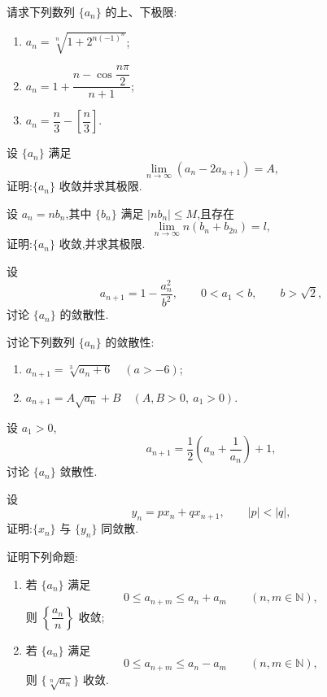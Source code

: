 \documentclass[../数学分析培优讲义.tex]{subfiles}
\begin{document}
\begin{example}
请求下列数列 $\{a_n\}$ 的上、下极限:
\begin{enumerate}[label=(\arabic*)]
  \item $\displaystyle a_n=\sqrt[n]{1+2^{n(-1)^n}}$;
  \item $\displaystyle a_n=1+\dfrac{n-\cos\dfrac{n\pi}{2}}{n+1}$;
  \item $\displaystyle a_n=\dfrac{n}{3}-\left[\dfrac{n}{3}\right]$.
\end{enumerate}
\end{example}
\exampleblank

\begin{example}
设 $\{a_n\}$ 满足
\[
\lim\limits_{n\to\infty}(a_n-2a_{n+1})=A,
\]
证明:$\{a_n\}$ 收敛并求其极限.
\end{example}
\exampleblank

\begin{example}
设 $a_n=nb_n$,其中 $\{b_n\}$ 满足 $|nb_n|\leq M$,且存在
\[
\lim\limits_{n\to\infty}n(b_n+b_{2n})=l,
\]
证明:$\{a_n\}$ 收敛,并求其极限.
\end{example}
\exampleblank

\begin{example}
设
\[
a_{n+1}=1-\dfrac{a_n^2}{b^2},
\qquad 0<a_1<b,
\qquad b>\sqrt2,
\]
讨论 $\{a_n\}$ 的敛散性.
\end{example}
\exampleblank

\begin{example}
讨论下列数列 $\{a_n\}$ 的敛散性:
\begin{enumerate}[label=(\arabic*)]
  \item $\displaystyle a_{n+1}=\sqrt[3]{a_n+6}\quad(a>-6)$;
  \item $\displaystyle a_{n+1}=A\sqrt{a_n}+B\quad(A,B>0,\ a_1>0)$.
\end{enumerate}
\end{example}
\exampleblank

\begin{example}
设 $a_1>0$,
\[
a_{n+1}=\dfrac{1}{2}\left(a_n+\dfrac{1}{a_n}\right)+1,
\]
讨论 $\{a_n\}$ 敛散性.
\end{example}
\exampleblank

\begin{example}
设
\[
y_n=px_n+qx_{n+1},
\qquad |p|<|q|,
\]
证明:$\{x_n\}$ 与 $\{y_n\}$ 同敛散.
\end{example}
\exampleblank

\begin{example}
证明下列命题:
\begin{enumerate}[label=(\arabic*)]
  \item 若 $\{a_n\}$ 满足
  \[
  0\leq a_{n+m}\leq a_n+a_m\qquad(n,m\in\mathbb N),
  \]
  则 $\left\{\dfrac{a_n}{n}\right\}$ 收敛;
  \item 若 $\{a_n\}$ 满足
  \[
  0\leq a_{n+m}\leq a_n-a_m\qquad(n,m\in\mathbb N),
  \]
  则 $\{\sqrt[n]{a_n}\}$ 收敛.
\end{enumerate}
\end{example}
\exampleblank
\end{document}
